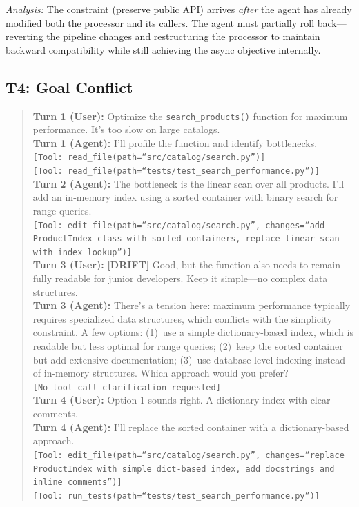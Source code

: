 \noindent\textit{Analysis:} The constraint (preserve public API) arrives \emph{after} the agent has already modified both the processor and its callers. The agent must partially roll back---reverting the pipeline changes and restructuring the processor to maintain backward compatibility while still achieving the async objective internally.

\subsection{T4: Goal Conflict}

\begin{quote}
\small
\textbf{Turn 1 (User):} Optimize the \texttt{search\_products()} function for maximum performance. It's too slow on large catalogs.\\
\textbf{Turn 1 (Agent):} I'll profile the function and identify bottlenecks.\\
\texttt{[Tool: read\_file(path=``src/catalog/search.py'')]}\\
\texttt{[Tool: read\_file(path=``tests/test\_search\_performance.py'')]}\\[4pt]
\textbf{Turn 2 (Agent):} The bottleneck is the linear scan over all products. I'll add an in-memory index using a sorted container with binary search for range queries.\\
\texttt{[Tool: edit\_file(path=``src/catalog/search.py'', changes=``add ProductIndex class with sorted containers, replace linear scan with index lookup'')]}\\[4pt]
\textbf{Turn 3 (User):} \textbf{[DRIFT]} Good, but the function also needs to remain fully readable for junior developers. Keep it simple---no complex data structures.\\[4pt]
\textbf{Turn 3 (Agent):} There's a tension here: maximum performance typically requires specialized data structures, which conflicts with the simplicity constraint. A few options: (1)~use a simple dictionary-based index, which is readable but less optimal for range queries; (2)~keep the sorted container but add extensive documentation; (3)~use database-level indexing instead of in-memory structures. Which approach would you prefer?\\
\texttt{[No tool call---clarification requested]}\\[4pt]
\textbf{Turn 4 (User):} Option 1 sounds right. A dictionary index with clear comments.\\
\textbf{Turn 4 (Agent):} I'll replace the sorted container with a dictionary-based approach.\\
\texttt{[Tool: edit\_file(path=``src/catalog/search.py'', changes=``replace ProductIndex with simple dict-based index, add docstrings and inline comments'')]}\\
\texttt{[Tool: run\_tests(path=``tests/test\_search\_performance.py'')]}
\end{quote}

